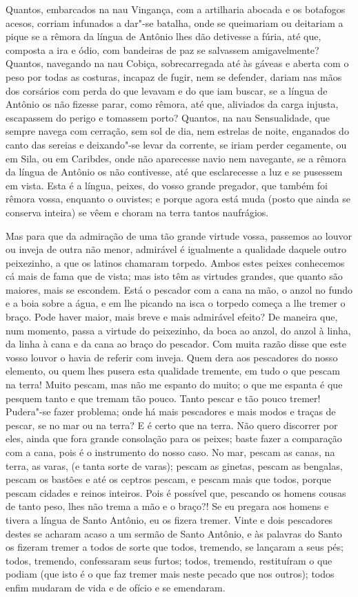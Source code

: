 Quantos, embarcados na nau Vingança, com a artilharia abocada e os
botafogos acesos, corriam infunados a dar"-se batalha, onde se queimariam
ou deitariam a pique se a rêmora da língua de Antônio lhes dão detivesse
a fúria, até que, composta a ira e ódio, com bandeiras de paz se
salvassem amigavelmente? Quantos, navegando na nau Cobiça,
sobrecarregada até às gáveas e aberta com o peso por todas as costuras,
incapaz de fugir, nem se defender, dariam nas mãos dos corsários com
perda do que levavam e do que iam buscar, se a língua de Antônio os não
fizesse parar, como rêmora, até que, aliviados da carga injusta,
escapassem do perigo e tomassem porto? Quantos, na nau Sensualidade, que
sempre navega com cerração, sem sol de dia, nem estrelas de noite,
enganados do canto das sereias e deixando"-se levar da corrente, se iriam
perder cegamente, ou em Sila, ou em Caribdes, onde não aparecesse navio
nem navegante, se a rêmora da língua de Antônio os não contivesse, até
que esclarecesse a luz e se pusessem em vista.
Esta é a língua, peixes, do vosso grande pregador, que também foi rêmora
vossa, enquanto o ouvistes; e porque agora está muda (posto que ainda se
conserva inteira) se vêem e choram na terra tantos naufrágios.

Mas para que da admiração de uma tão grande virtude vossa, passemos ao
louvor ou inveja de outra não menor, admirável é igualmente a qualidade
daquele outro peixezinho, a que os latinos chamaram torpedo. Ambos estes
peixes conhecemos cá mais de fama que de vista; mas isto têm as virtudes
grandes, que quanto são maiores, mais se escondem. Está o pescador com a
cana na mão, o anzol no fundo e a boia sobre a água, e em lhe picando na
isca o torpedo começa a
lhe tremer o braço. Pode haver maior, mais breve e mais admirável
efeito? De maneira que, num momento, passa a virtude do peixezinho, da
boca ao anzol, do anzol à linha, da linha à cana e da cana ao braço do
pescador.
Com muita razão disse que este vosso louvor o havia de referir com
inveja. Quem dera aos pescadores do nosso elemento, ou quem lhes pusera
esta qualidade tremente, em tudo o que pescam na terra! Muito pescam,
mas não me espanto do muito; o que me espanta é que pesquem tanto e que
tremam tão pouco. Tanto pescar e tão pouco tremer!
Pudera"-se fazer problema; onde há mais pescadores e mais modos e traças
de pescar, se no mar ou na terra? E é certo que na terra. Não quero
discorrer por eles, ainda que fora grande consolação para os peixes;
baste fazer a comparação com a cana, pois é o instrumento do nosso caso.
No mar, pescam as canas, na terra, as varas, (e tanta sorte de varas);
pescam as ginetas, pescam as bengalas, pescam os bastões e até os
ceptros pescam, e pescam mais que todos, porque pescam cidades e reinos
inteiros. Pois é possível que, pescando os homens cousas de tanto peso,
lhes não trema a mão e o braço?! Se eu pregara aos homens e tivera a
língua de Santo Antônio, eu os fizera tremer.
Vinte e dois pescadores destes se acharam acaso a um sermão de Santo
Antônio, e às palavras do Santo os fizeram tremer a todos de sorte que
todos, tremendo, se lançaram a seus pés; todos, tremendo, confessaram
seus furtos; todos, tremendo, restituíram o que podiam (que isto é o que
faz tremer mais neste pecado que nos outros); todos enfim mudaram de
vida e de ofício e se emendaram.


